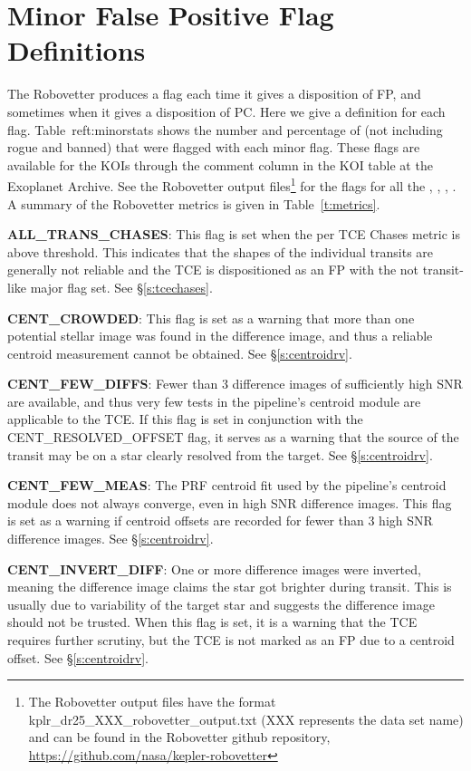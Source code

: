 \section{Minor False Positive Flag Definitions}
\label{s:minorflags}
The Robovetter produces a flag each time it gives a disposition of FP, and sometimes when it gives a disposition of PC.   Here we give a definition for each flag.  Table~ref{t:minorstats} shows the number and percentage of  (not including rogue and banned) that were flagged with each minor flag. These flags are available for the KOIs through the comment column in the KOI table at the Exoplanet Archive. See the Robovetter output files\footnote{The Robovetter output files have the format kplr\_dr25\_XXX\_robovetter\_output.txt (XXX represents the data set name) and can be found in the Robovetter github repository, \url{https://github.com/nasa/kepler-robovetter}} for the flags for all the , , , . A summary of the Robovetter metrics is given in Table~\ref{t:metrics}.


\textbf{ALL\_TRANS\_CHASES}: This flag is set when the per TCE Chases metric is above threshold. This indicates that the shapes of the individual transits are generally not reliable and the TCE is dispositioned as an FP with the not transit-like major flag set. See \S\ref{s:tcechases}.

\textbf{CENT\_CROWDED}: This flag is set as a warning that more than one potential stellar image was found in the difference image, and thus a reliable centroid measurement cannot be obtained. See \S\ref{s:centroidrv}.

\textbf{CENT\_FEW\_DIFFS}: Fewer than 3 difference images of sufficiently high SNR are available, and thus very few tests in the pipeline's centroid module are applicable to the TCE. If this flag is set in conjunction with the CENT\_RESOLVED\_OFFSET flag, it serves as a warning that the source of the transit may be on a star clearly resolved from the target. See \S\ref{s:centroidrv}.

\textbf{CENT\_FEW\_MEAS}: The PRF centroid fit used by the pipeline's centroid module does not always converge, even in high SNR difference images. This flag is set as a warning if centroid offsets are recorded for fewer than 3 high SNR difference images. See \S\ref{s:centroidrv}.

\textbf{CENT\_INVERT\_DIFF}: One or more difference images were inverted, meaning the difference image claims the star got brighter during transit. This is usually due to variability of the target star and suggests the difference image should not be trusted. When this flag is set, it is a warning that the TCE requires further scrutiny, but the TCE is not marked as an FP due to a centroid offset. See \S\ref{s:centroidrv}.

